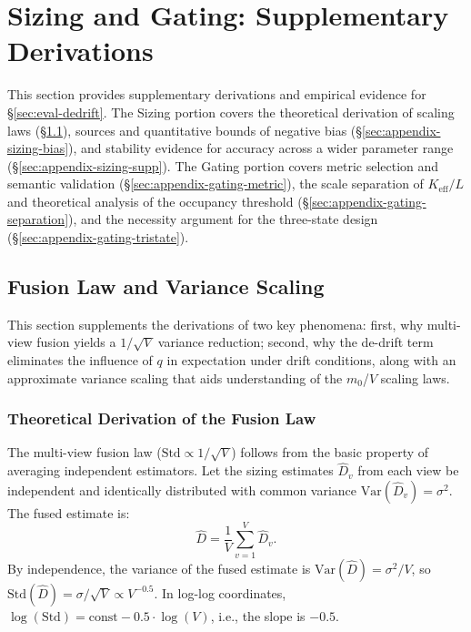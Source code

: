 \section{Sizing and Gating: Supplementary Derivations}
\label{sec:appendix-sizing-gating}

This section provides supplementary derivations and empirical evidence for \S\ref{sec:eval-dedrift}. The Sizing portion covers the theoretical derivation of scaling laws (\S\ref{sec:appendix-sizing-derivation}), sources and quantitative bounds of negative bias (\S\ref{sec:appendix-sizing-bias}), and stability evidence for accuracy across a wider parameter range (\S\ref{sec:appendix-sizing-supp}). The Gating portion covers metric selection and semantic validation (\S\ref{sec:appendix-gating-metric}), the scale separation of $K_{\text{eff}}/L$ and theoretical analysis of the occupancy threshold (\S\ref{sec:appendix-gating-separation}), and the necessity argument for the three-state design (\S\ref{sec:appendix-gating-tristate}).

\subsection{Fusion Law and Variance Scaling}
\label{sec:appendix-sizing-derivation}

This section supplements the derivations of two key phenomena: first, why multi-view fusion yields a $1/\sqrt{V}$ variance reduction; second, why the de-drift term eliminates the influence of $q$ in expectation under drift conditions, along with an approximate variance scaling that aids understanding of the $m_0$/$V$ scaling laws.

\subsubsection{Theoretical Derivation of the Fusion Law}
\label{sec:appendix-fusion-law}

The multi-view fusion law ($\text{Std} \propto 1/\sqrt{V}$) follows from the basic property of averaging independent estimators. Let the sizing estimates $\hat D_v$ from each view be independent and identically distributed with common variance $\text{Var}(\hat D_v) = \sigma^2$. The fused estimate is:
\[
\hat D = \frac{1}{V}\sum_{v=1}^{V} \hat D_v.
\]
By independence, the variance of the fused estimate is $\text{Var}(\hat D)=\sigma^2/V$, so $\text{Std}(\hat D) = \sigma/\sqrt{V} \propto V^{-0.5}$. In log-log coordinates, $\log(\text{Std}) = \text{const} - 0.5 \cdot \log(V)$, i.e., the slope is $-0.5$.

